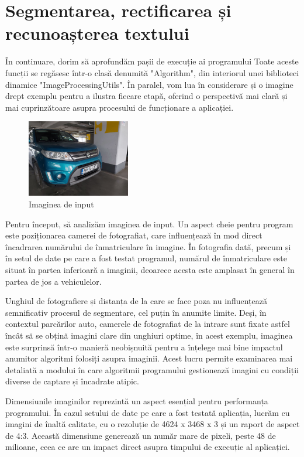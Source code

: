 \documentclass[a4paper,12pt]{report}
\begin{document}
\section{Segmentarea, rectificarea și recunoașterea textului}
În continuare, dorim să aprofundăm pașii de execuție ai programului Toate aceste funcții se regăsesc într-o clasă denumită "Algorithm", din interiorul unei biblioteci dinamice "ImageProcessingUtils". În paralel, vom lua în considerare și o imagine drept exemplu pentru a ilustra fiecare etapă, oferind o perspectivă mai clară și mai cuprinzătoare asupra procesului de funcționare a aplicației.

\begin{figure}[h!]
    \centering
    \includegraphics[width=0.4\textwidth]{images/input.jpg}
    \caption{Imaginea de input}
\end{figure}
\FloatBarrier

Pentru început, să analizăm imaginea de input. Un aspect cheie pentru program este poziționarea camerei de fotografiat, care influențează în mod direct încadrarea numărului de înmatriculare în imagine. În fotografia dată, precum și în setul de date pe care a fost testat programul, numărul de înmatriculare este situat în partea inferioară a imaginii, deoarece acesta este amplasat în general în partea de jos a vehiculelor.

Unghiul de fotografiere și distanța de la care se face poza nu influențează semnificativ procesul de segmentare, cel puțin în anumite limite. Deși, în contextul parcărilor auto, camerele de fotografiat de la intrare sunt fixate astfel încât să se obțină imagini clare din unghiuri optime, în acest exemplu, imaginea este surprinsă într-o manieră neobișnuită pentru a înțelege mai bine impactul anumitor algoritmi folosiți asupra imaginii. Acest lucru permite examinarea mai detaliată a modului în care algoritmii programului gestionează imagini cu condiții diverse de captare și încadrate atipic.

Dimensiunile imaginilor reprezintă un aspect esențial pentru performanța programului. În cazul setului de date pe care a fost testată aplicația, lucrăm cu imagini de înaltă calitate, cu o rezoluție de 4624 x 3468 x 3 și un raport de aspect de 4:3. Această dimensiune generează un număr mare de pixeli, peste 48 de milioane, ceea ce are un impact direct asupra timpului de execuție al aplicației.
\end{document}

